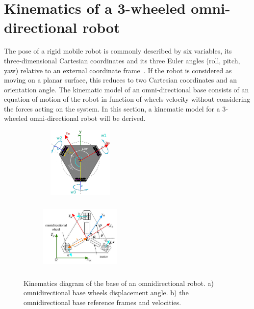 \section{Kinematics of a 3-wheeled omni-directional robot}\label{sec:kinematics}
The pose of a rigid mobile robot is commonly described by six variables, its three-dimensional Cartesian coordinates and its three Euler angles (roll, pitch, yaw) relative to an external coordinate frame~\citep{thrun_probabilistic_2005}. If the robot is considered as moving on a planar surface, this reduces to two Cartesian coordinates and an orientation angle.
The kinematic model of an omni-directional base consists of an equation of motion of the robot in function of wheels velocity without considering the forces acting on the system. In this section, a kinematic model for a 3-wheeled omni-directional robot will be derived.

\begin{figure}[H]
  \centering
  \begin{subfigure}[b]{0.4\textwidth}
     \centering
      \includegraphics[width=4cm, height=3.5cm]{images/03-foundation/triskarbase1}
	\caption{}
	\label{triskar1} 
  \end{subfigure}
  \begin{subfigure}[b]{0.4\textwidth}
  \centering
      \includegraphics[width=4cm, height=3.5cm]{images/03-foundation/triskarbase2}
	\caption{}
	\label{triskar2} 
  \end{subfigure}
  \caption{Kinematics diagram of the base of an omnidirectional robot. a) omnidirectional base wheels displacement angle. b) the omnidirectional base reference frames and velocities.}
\end{figure}

